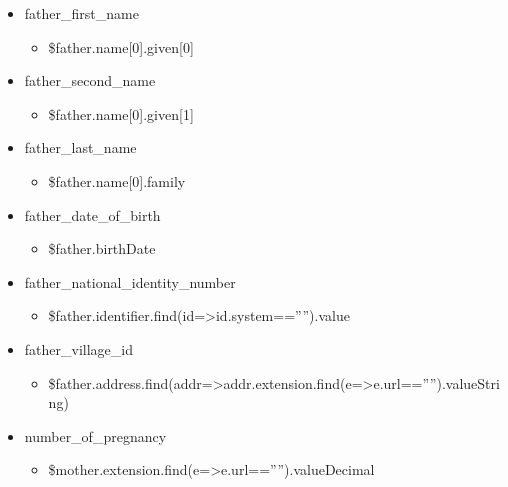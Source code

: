 \documentclass[letterpaper,10pt,english]{sphinxmanual}
\begin{document}
\begin{itemize}
\item {} 
\sphinxAtStartPar
father\_first\_name
\begin{itemize}
\item {} 
\sphinxAtStartPar
\$father.name{[}0{]}.given{[}0{]}

\end{itemize}

\item {} 
\sphinxAtStartPar
father\_second\_name
\begin{itemize}
\item {} 
\sphinxAtStartPar
\$father.name{[}0{]}.given{[}1{]}

\end{itemize}

\item {} 
\sphinxAtStartPar
father\_last\_name
\begin{itemize}
\item {} 
\sphinxAtStartPar
\$father.name{[}0{]}.family

\end{itemize}

\item {} 
\sphinxAtStartPar
father\_date\_of\_birth
\begin{itemize}
\item {} 
\sphinxAtStartPar
\$father.birthDate

\end{itemize}

\item {} 
\sphinxAtStartPar
father\_national\_identity\_number
\begin{itemize}
\item {} 
\sphinxAtStartPar
\$father.identifier.find(id=\textgreater{}id.system==””).value

\end{itemize}

\item {} 
\sphinxAtStartPar
father\_village\_id
\begin{itemize}
\item {} 
\sphinxAtStartPar
\$father.address.find(addr=\textgreater{}addr.extension.find(e=\textgreater{}e.url==””).valueString)

\end{itemize}

\item {} 
\sphinxAtStartPar
number\_of\_pregnancy
\begin{itemize}
\item {} 
\sphinxAtStartPar
\$mother.extension.find(e=\textgreater{}e.url==””).valueDecimal


\end{itemize}
\end{itemize}
\end{document}
